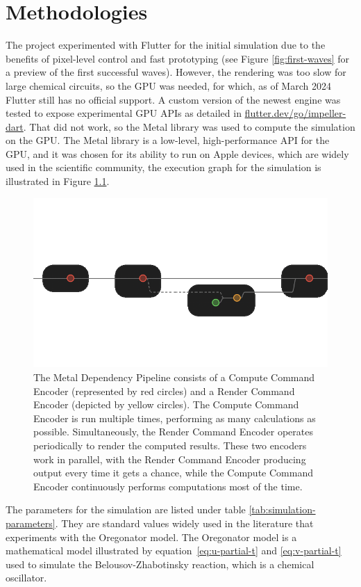 \chapter{Methodologies}
The project experimented with Flutter for the initial simulation due to the benefits of pixel-level control and fast prototyping (see Figure \ref{fig:first-waves} for a preview of the first successful waves). However, the rendering was too slow for large chemical circuits, so the GPU was needed, for which, as of March 2024 Flutter still has no official support. A custom version of the newest engine was tested to expose experimental GPU APIs as detailed in \href{flutter.dev/go/impeller-dart}{flutter.dev/go/impeller-dart}.
That did not work, so the Metal library was used to compute the simulation on the GPU. 
The Metal library is a low-level, high-performance API for the GPU, and it was chosen for its ability to run on Apple devices, which are widely used in the scientific community, the execution graph for the simulation is illustrated in Figure \ref{fig:metal-dependency-pipline}.

\begin{figure}
    \centering
    \includegraphics[width=0.5\linewidth]{metal-pipeline.png}
    \caption{The Metal Dependency Pipeline consists of a Compute Command Encoder (represented by red circles) and a Render Command Encoder (depicted by yellow circles). The Compute Command Encoder is run multiple times, performing as many calculations as possible. Simultaneously, the Render Command Encoder operates periodically to render the computed results. These two encoders work in parallel, with the Render Command Encoder producing output every time it gets a chance, while the Compute Command Encoder continuously performs computations most of the time.}
    \label{fig:metal-dependency-pipline}
\end{figure}


The parameters for the simulation are listed under table \ref{tab:simulation-parameters}. 
They are standard values widely used in the literature that experiments with the Oregonator model.
The Oregonator model is a mathematical model illustrated by equation~\ref{eq:u-partial-t} and \ref{eq:v-partial-t} used to simulate the Belousov-Zhabotinsky reaction, which is a chemical oscillator.


